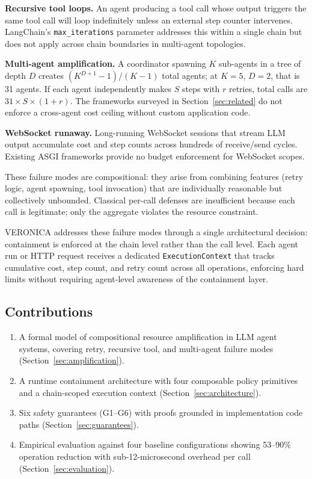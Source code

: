 \documentclass[11pt]{article}
\begin{document}
\textbf{Recursive tool loops.} An agent producing a tool call whose output
triggers the same tool call will loop indefinitely unless an external step
counter intervenes. LangChain's \texttt{max\_iterations} parameter addresses
this within a single chain but does not apply across chain boundaries in
multi-agent topologies.

\textbf{Multi-agent amplification.} A coordinator spawning $K$ sub-agents in
a tree of depth $D$ creates $(K^{D+1} - 1) / (K - 1)$ total agents; at
$K{=}5$, $D{=}2$, that is 31 agents. If each agent independently makes $S$
steps with $r$ retries, total calls are $31 \times S \times (1 + r)$. The
frameworks surveyed in Section~\ref{sec:related} do not enforce a cross-agent
cost ceiling without custom application code.

\textbf{WebSocket runaway.} Long-running WebSocket sessions that stream LLM
output accumulate cost and step counts across hundreds of receive/send cycles.
Existing ASGI frameworks provide no budget enforcement for WebSocket scopes.

These failure modes are compositional: they arise from combining features
(retry logic, agent spawning, tool invocation) that are individually
reasonable but collectively unbounded. Classical per-call defenses are
insufficient because each call is legitimate; only the aggregate violates the
resource constraint.

VERONICA addresses these failure modes through a single architectural
decision: containment is enforced at the chain level rather than the call
level. Each agent run or HTTP request receives a dedicated
\texttt{ExecutionContext} that tracks cumulative cost, step count, and retry
count across all operations, enforcing hard limits without requiring
agent-level awareness of the containment layer.

\subsection{Contributions}
\label{sec:contributions}

\begin{enumerate}
  \item A formal model of compositional resource amplification in LLM agent
    systems, covering retry, recursive tool, and multi-agent failure modes
    (Section~\ref{sec:amplification}).
  \item A runtime containment architecture with four composable policy
    primitives and a chain-scoped execution context
    (Section~\ref{sec:architecture}).
  \item Six safety guarantees (G1--G6) with proofs grounded in implementation
    code paths (Section~\ref{sec:guarantees}).
  \item Empirical evaluation against four baseline configurations showing
    53--90\% operation reduction with sub-12-microsecond overhead per call
    (Section~\ref{sec:evaluation}).
\end{enumerate}
\end{document}
